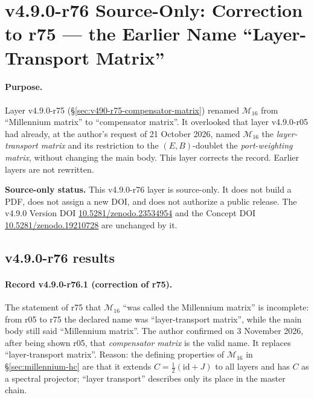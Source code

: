 
\clearpage
\section*{v4.9.0-r76 Source-Only: Correction to r75 --- the Earlier Name ``Layer-Transport Matrix''}
\label{sec:v490-r76-name-correction}

\paragraph{Purpose.}
Layer v4.9.0-r75 (\S\ref{sec:v490-r75-compensator-matrix}) renamed \(\mathcal M_{16}\) from ``Millennium matrix'' to
``compensator matrix''.  It overlooked that layer v4.9.0-r05 had already, at the author's request of 21 October 2026, named
\(\mathcal M_{16}\) the \emph{layer-transport matrix} and its restriction to the \((E,B)\)-doublet the \emph{port-weighting
matrix}, without changing the main body.  This layer corrects the record.  Earlier layers are not rewritten.

\noindent\textbf{Source-only status.}
This v4.9.0-r76 layer is source-only.  It does not build a PDF, does not assign a new DOI,
and does not authorize a public release.  The v4.9.0 Version DOI
\href{https://doi.org/10.5281/zenodo.23534954}{10.5281/zenodo.23534954} and the Concept DOI
\href{https://doi.org/10.5281/zenodo.19210728}{10.5281/zenodo.19210728} are unchanged by it.

\subsection*{v4.9.0-r76 results}
\label{subsec:v490-r76-results}

\paragraph{Record v4.9.0-r76.1 (correction of r75).}
The statement of r75 that \(\mathcal M_{16}\) ``was called the Millennium matrix'' is incomplete: from r05 to r75 the
declared name was ``layer-transport matrix'', while the main body still said ``Millennium matrix''.  The author confirmed on
3 November 2026, after being shown r05, that \emph{compensator matrix} is the valid name.  It replaces ``layer-transport
matrix''.  Reason: the defining properties of \(\mathcal M_{16}\) in \S\ref{sec:millennium-hc} are that it extends
\(C=\tfrac12(\mathrm{id}+J)\) to all layers and has \(C\) as a spectral projector; ``layer transport'' describes only its place
in the master chain.

